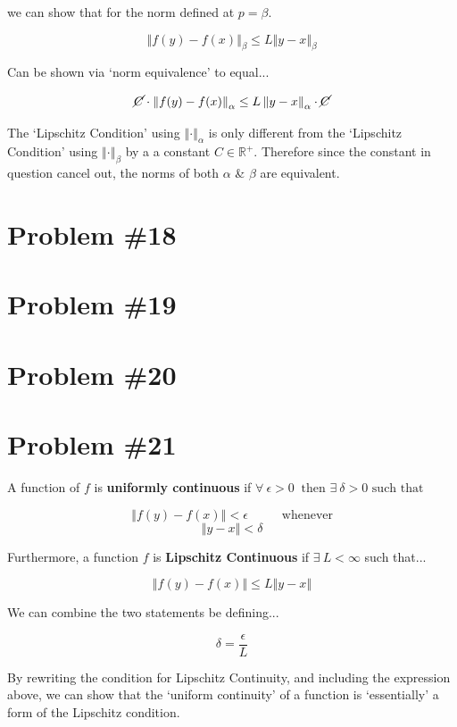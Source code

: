 \documentclass[12px]{article}
\newcommand{\R}{\mathbb{R}}
\begin{document}
\noindent we can show that for the norm defined at $p = \beta$.

$$
\left\Vert f(y) - f(x) \right\Vert_{\beta} \leq L \left\Vert y - x \right\Vert_{\beta}
$$

\noindent Can be shown via `norm equivalence' to equal...

$$
\cancel{C} \cdot \left\Vert f(y) - f(x) \right\Vert_{\alpha} \leq L \left\Vert y - x \right\Vert_{\alpha} \cdot \cancel{C}
$$

\noindent The `Lipschitz Condition' using $ \left\Vert \cdot \right\Vert_{\alpha}$ is only different from the `Lipschitz Condition' using $\left\Vert \cdot \right\Vert_{\beta}$ by a a constant $C \in \R^{+}$. Therefore since the constant in question cancel out, the norms of both $ \alpha$ \& $\beta$ are equivalent.

\section{Problem \#18}

\section{Problem \#19}

\section{Problem \#20}

\section{Problem \#21}

A function of $f$ is \textbf{uniformly continuous} if $\forall \: \epsilon > 0 \: \text{ then } \exists \: \delta > 0 \text{ such that }$

$$ \left\Vert f(y) - f(x) \right\Vert < \epsilon \hspace{1cm} \text{ whenever} $$
$$ \left\Vert y - x \right\Vert < \delta $$

\noindent Furthermore, a function $f$ is \textbf{Lipschitz Continuous} if $\exists \: L < \infty$ such that...

$$
\left\Vert f(y) - f(x) \right\Vert \leq L \left\Vert y -x \right\Vert
$$

\noindent We can combine the two statements be defining...

$$ \delta = \frac{\epsilon}{L} $$

\noindent By rewriting the condition for Lipschitz Continuity, and including the expression above, we can show that the `uniform continuity' of a function is `essentially' a form of the Lipschitz condition.
\end{document}
